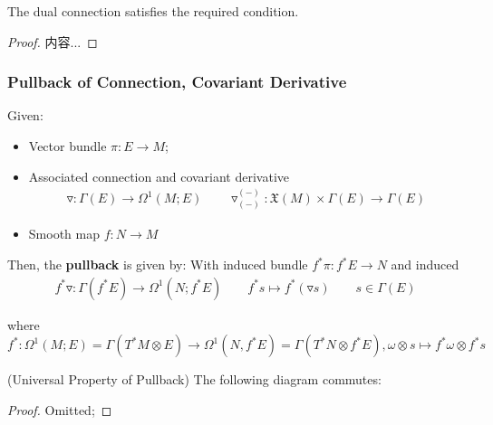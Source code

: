 \documentclass[Total.tex]{subfiles}
\begin{document}
				\begin{proposition}
					The dual connection satisfies the required condition.
				\end{proposition}
				\begin{proof}
					内容...
				\end{proof}
				
			\subsubsection{Pullback of Connection, Covariant Derivative}
				\begin{Def}
					Given:
					\begin{itemize}
						\item Vector bundle $\pi:E\rightarrow M$;
						\item Associated connection and covariant derivative 
						\begin{gather*}
							\triangledown:\Gamma(E)\rightarrow \Omega^1(M;E)\qquad \triangledown_{(-)}^{(-)}:\mathfrak{X}(M)\times \Gamma(E)\rightarrow \Gamma(E)
						\end{gather*}
						\item Smooth map $f:N\rightarrow M$
					\end{itemize}
					
					Then, the \textbf{pullback} is given by: With induced bundle $f^*\pi:f^*E\rightarrow N$ and induced 
					\begin{gather*}
						f^*\triangledown:\Gamma(f^*E)\rightarrow \Omega^1(N;f^*E)\qquad f^*s\mapsto f^*(\triangledown s)\qquad s\in \Gamma(E)
					\end{gather*}
					
					where $f^*:\Omega^1(M;E)=\Gamma(T^*M\otimes E)\rightarrow \Omega^1(N,f^*E)=\Gamma(T^*N\otimes f^*E),\omega\otimes s\mapsto f^*\omega\otimes f^*s$
				\end{Def}
				
				\begin{proposition}
					(Universal Property of Pullback) The following diagram commutes:
					\begin{center}
					\end{center}
					
					
				\end{proposition}
				\begin{proof}
					Omitted;
				\end{proof}
\end{document}

